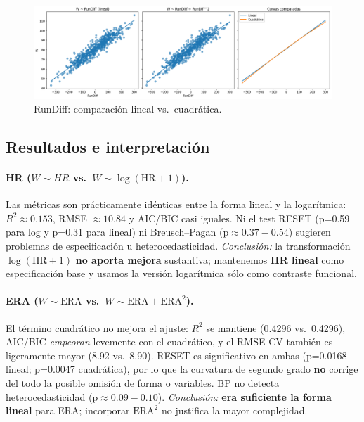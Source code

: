 \documentclass[10pt]{article}
\begin{document}
    \begin{figure}[H]\centering
    \includegraphics[width=\textwidth]{../plots/formas_funcionales_RunDiff.png}
    \caption{RunDiff: comparación lineal vs.\ cuadrática.}
    \label{fig:ff_rundiff}
\end{figure}

\subsection{Resultados e interpretación}

    \paragraph{HR (\(W \sim HR\) vs.\ \(W \sim \log(\text{HR}+1)\)).}
    Las métricas son prácticamente idénticas entre la forma lineal y la logarítmica: \(R^2 \approx 0.153\), RMSE \(\approx 10.84\) y AIC/BIC casi iguales. 
    Ni el test RESET (p=0.59 para log y p=0.31 para lineal) ni Breusch--Pagan (p\(\approx 0.37{-}0.54\)) sugieren problemas de especificación u heterocedasticidad. 
    \textit{Conclusión:} la transformación \(\log(\text{HR}+1)\) \textbf{no aporta mejora} sustantiva; mantenemos \textbf{HR lineal} como especificación base y usamos la versión logarítmica sólo como contraste funcional.

    \paragraph{ERA (\(W \sim \text{ERA}\) vs.\ \(W \sim \text{ERA}+\text{ERA}^2\)).}
    El término cuadrático no mejora el ajuste: \(R^2\) se mantiene (0.4296 vs.\ 0.4296), AIC/BIC \textit{empeoran} levemente con el cuadrático, y el RMSE-CV también es ligeramente mayor (8.92 vs.\ 8.90). 
    RESET es significativo en ambas (p=0.0168 lineal; p=0.0047 cuadrática), por lo que la curvatura de segundo grado \textbf{no} corrige del todo la posible omisión de forma o variables. 
    BP no detecta heterocedasticidad (p\(\approx 0.09{-}0.10\)). 
    \textit{Conclusión:} \textbf{era suficiente la forma lineal} para ERA; incorporar \(\text{ERA}^2\) no justifica la mayor complejidad.
\end{document}
